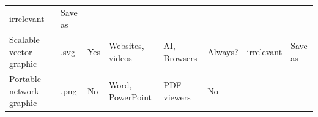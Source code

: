 \documentclass[]{article}
\begin{document}
\begin{longtable}[]{@{}llllllll@{}}
\begin{minipage}[t]{0.11\columnwidth}
irrelevant\strut
\end{minipage} & \begin{minipage}[t]{0.09\columnwidth}\raggedright\strut
Save as\strut
\end{minipage}\tabularnewline
\begin{minipage}[t]{0.16\columnwidth}\raggedright\strut
Scalable vector graphic\strut
\end{minipage} & \begin{minipage}[t]{0.06\columnwidth}\raggedright\strut
.svg\strut
\end{minipage} & \begin{minipage}[t]{0.07\columnwidth}\raggedright\strut
Yes\strut
\end{minipage} & \begin{minipage}[t]{0.10\columnwidth}\raggedright\strut
Websites, videos\strut
\end{minipage} & \begin{minipage}[t]{0.10\columnwidth}\raggedright\strut
AI, Browsers\strut
\end{minipage} & \begin{minipage}[t]{0.10\columnwidth}\raggedright\strut
Always?\strut
\end{minipage} & \begin{minipage}[t]{0.11\columnwidth}\raggedright\strut
irrelevant\strut
\end{minipage} & \begin{minipage}[t]{0.09\columnwidth}\raggedright\strut
Save as\strut
\end{minipage}\tabularnewline
\begin{minipage}[t]{0.16\columnwidth}\raggedright\strut
Portable network graphic\strut
\end{minipage} & \begin{minipage}[t]{0.06\columnwidth}\raggedright\strut
.png\strut
\end{minipage} & \begin{minipage}[t]{0.07\columnwidth}\raggedright\strut
No\strut
\end{minipage} & \begin{minipage}[t]{0.10\columnwidth}\raggedright\strut
Word, PowerPoint\strut
\end{minipage} & \begin{minipage}[t]{0.10\columnwidth}\raggedright\strut
PDF viewers\strut
\end{minipage} & \begin{minipage}[t]{0.10\columnwidth}\raggedright\strut
No\strut
\end{minipage} & \begin{minipage}[t]{0.11\columnwidth}\raggedright\strut

\end{minipage}
\end{longtable}
\end{document}
